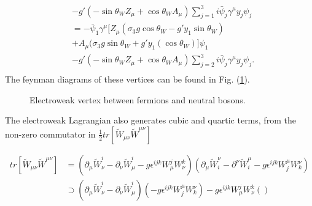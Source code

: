 \documentclass[11pt]{article}
\begin{document}
\begin{multicols}{2}
\begin{flushleft}
\begin{align*}
& -g' (- \sin \theta_W Z_{\mu} + \cos \theta_W A_{\mu}) \sum_{j=1}^3 i\bar{\psi}_j \gamma^{\mu} y_j \psi_j\\
&= -\bar{\psi}_1 \gamma^{\mu}  [ Z_{\mu}(\sigma_3 g \cos \theta_W - g' y_1 \sin \theta_W)\\&+ A_{\mu} (\sigma_3 g \sin \theta_W + g' y_1 (\cos \theta_W)] 
 \psi_1\\
& -g' (- \sin \theta_W Z_{\mu} + \cos \theta_W A_{\mu}) \sum_{j=2}^3 i\bar{\psi}_j \gamma^{\mu} y_j \psi_j.\\
\end{align*}
The feynman diagrams of these vertices can be found in Fig. (\ref{fig:: EW neutral}).
\begin{figure}[H]
\centering
{}
\caption{Electroweak vertex between fermions and neutral bosons.}
\label{fig:: EW neutral}
\end{figure}
\end{flushleft}

\begin{flushleft}
The electroweak Lagrangian also generates cubic and quartic terms, from the non-zero commutator in $\frac{1}{2} tr[\tilde{W}_{\mu \nu} \tilde{W}^{\mu \nu}]$
\end{flushleft}
\end{multicols}

\begin{align*}
tr[\tilde{W}_{\mu \nu} \tilde{W}^{\mu \nu}] &= (\partial_{\mu} \tilde{W}_{\nu}^i 
- \partial_{\nu} \tilde{W}_{\mu}^i 
- g \epsilon^{ijk} W_{\mu}^j W_{\nu}^k )
(\partial_{\mu} \tilde{W}^{\nu}_i 
- \partial^{\nu} \tilde{W}^{\mu}_i 
- g \epsilon^{ijk} W^{\mu}_j W^{\nu}_k) \\
& \supset (\partial_{\mu} \tilde{W}_{\nu}^i 
- \partial_{\nu} \tilde{W}_{\mu}^i)(- g \epsilon^{ijk} W^{\mu}_j W^{\nu}_k)
- g \epsilon^{ijk} W_{\mu}^j W_{\nu}^k  ()
\end{align*} 
\end{document}
